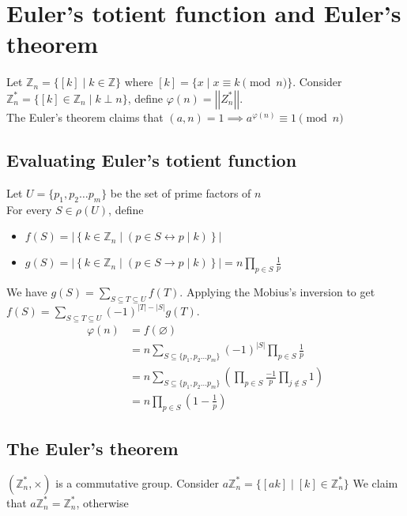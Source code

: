 \documentclass{article}
\newcommand{\ZZ}{\mathbb{Z}}
\begin{document}
\tableofcontents

\newpage

\section{Euler's totient function and Euler's theorem}

Let $\ZZ_n=\{[k]\mid k\in \ZZ \}$ where $[k]=\{ x\mid x\equiv k\pmod n \}$.
Consider $\ZZ_n^\ast = \{[k]\in \ZZ_n \mid k\perp n\}$, define $\varphi(n)=\left\vert|Z_n^\ast|\right\vert$.\\
The Euler's theorem claims that $(a,n)=1\implies a^{\varphi(n)}\equiv 1\pmod n$

\subsection{Evaluating Euler's totient function}

Let $U=\{p_1,p_2\ldots p_m\}$ be the set of prime factors of $n$\\
For every $S\in \rho(U)$, define
\begin{itemize}
	\item $f(S)=\left\vert
		\left\{
			k\in \ZZ_n
			\mid
			(p\in S \leftrightarrow p\mid k)
			\right\}
		\right\vert$
	\item $g(S)=\left\vert
		\left\{
			k\in \ZZ_n
			\mid
			(p\in S \rightarrow p\mid k)
			\right\}
		\right\vert=n\prod_{p\in S} \frac{1}{p}$
\end{itemize}

We have $g(S)=\sum_{S\subseteq T\subseteq U} f(T)$.
Applying the Mobius's inversion to get $f(S)=\sum_{S\subseteq T\subseteq U}{(-1)}^{|T|-|S|}g(T)$.\\

$$
\begin{aligned}
\varphi(n)
&=f(\varnothing)\\
&=n\sum_{S\subseteq \{p_1,p_2\ldots p_m\}}{(-1)}^{|S|}\prod_{p \in S}\frac{1}{p}\\
&=n\sum_{S\subseteq \{p_1,p_2\ldots p_m\}}\left(\prod_{p \in S}\frac{-1}{p} \prod_{j\not\in S} 1\right)\\
&=n\prod_{p\in S}(1-\frac{1}{p})
\end{aligned}
$$


\subsection{The Euler's theorem}

$(\ZZ_n^\ast,\times)$ is a commutative group.
Consider $a\ZZ_n^\ast=\{[ak]\mid [k]\in \ZZ_n^\ast\}$
We claim that $a\ZZ_n^\ast = \ZZ_n^\ast$, otherwise\\
\end{document}
